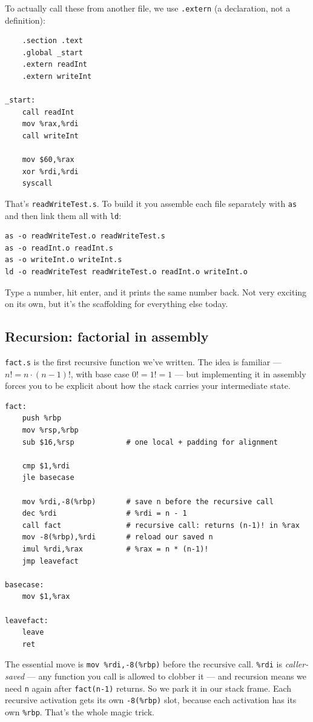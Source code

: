 \documentclass[11pt]{article}
\begin{document}
To actually call these from another file, we use \texttt{.extern} (a
declaration, not a definition):

\begin{lstlisting}
    .section .text
    .global _start
    .extern readInt
    .extern writeInt

_start:
    call readInt
    mov %rax,%rdi
    call writeInt

    mov $60,%rax
    xor %rdi,%rdi
    syscall
\end{lstlisting}

That's \texttt{readWriteTest.s}. To build it you assemble each file
separately with \texttt{as} and then link them all with \texttt{ld}:

\begin{lstlisting}
as -o readWriteTest.o readWriteTest.s
as -o readInt.o readInt.s
as -o writeInt.o writeInt.s
ld -o readWriteTest readWriteTest.o readInt.o writeInt.o
\end{lstlisting}

Type a number, hit enter, and it prints the same number back. Not
very exciting on its own, but it's the scaffolding for everything
else today.

\subsection*{Recursion: factorial in assembly}

\texttt{fact.s} is the first recursive function we've written. The
idea is familiar --- $n! = n \cdot (n-1)!$, with base case
$0! = 1! = 1$ --- but implementing it in assembly forces you to be
explicit about how the stack carries your intermediate state.

\begin{lstlisting}
fact:
    push %rbp
    mov %rsp,%rbp
    sub $16,%rsp            # one local + padding for alignment

    cmp $1,%rdi
    jle basecase

    mov %rdi,-8(%rbp)       # save n before the recursive call
    dec %rdi                # %rdi = n - 1
    call fact               # recursive call: returns (n-1)! in %rax
    mov -8(%rbp),%rdi       # reload our saved n
    imul %rdi,%rax          # %rax = n * (n-1)!
    jmp leavefact

basecase:
    mov $1,%rax

leavefact:
    leave
    ret
\end{lstlisting}

The essential move is \texttt{mov \%rdi,-8(\%rbp)} before the
recursive call. \texttt{\%rdi} is \emph{caller-saved} --- any
function you call is allowed to clobber it --- and recursion means we
need \texttt{n} again after \texttt{fact(n-1)} returns. So we park it
in our stack frame. Each recursive activation gets its own
\texttt{-8(\%rbp)} slot, because each activation has its own
\texttt{\%rbp}. That's the whole magic trick.
\end{document}
